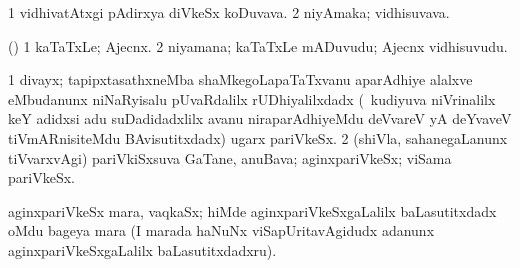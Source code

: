 \bentry
{}
\gl{\nA}
\bmng
\bnum
\num{1} vidhivatAtxgi pAdirxya diVkeSx koDuvava. 
\num{2} niyAmaka; vidhisuvava. 
\enum
\emng
\eentry

\bentry
{}
\gl{\nA}
\bmng
(\viparx) 
\bnum
\num{1} kaTaTxLe; Ajecnx. 
\num{2} niyamana; kaTaTxLe mADuvudu; Ajecnx vidhisuvudu. 
\enum
\emng
\eentry

\bentry
{}
\gl{\nA}
\bmng
\bnum
\num{1} divayx; tapipxtasathxneMba shaMkegoLapaTaTxvanu aparAdhiye alalxve eMbudanunx niNaRyisalu pUvaRdalilx rUDhiyalilxdadx (\udA\ kudiyuva niVrinalilx keY adidxsi adu suDadidadxlilx avanu niraparAdhiyeMdu deVvareV yA deYvaveV tiVmARnisiteMdu BAvisutitxdadx) ugarx pariVkeSx. 
\num{2} (shiVla, sahanegaLanunx tiVvarxvAgi) pariVkiSxsuva GaTane, anuBava; aginxpariVkeSx; viSama pariVkeSx. 
\enum
\emng

\noindent
\gl{\pagu}
\bmng
{} aginxpariVkeSx mara, vaqkaSx; hiMde aginxpariVkeSxgaLalilx baLasutitxdadx oMdu bageya mara (I marada haNuNx viSapUritavAgidudx adanunx aginxpariVkeSxgaLalilx baLasutitxdadxru). 
\emng
\eentry

